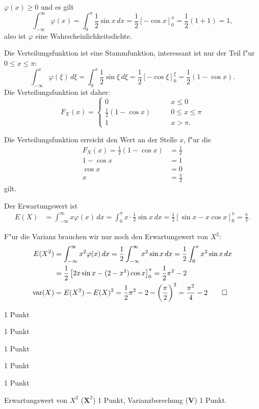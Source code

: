 \begin{loesung}
\begin{teilaufgaben}
\item
$\varphi(x)\ge 0$ und es gilt
\[
\int_{-\infty}^\infty\varphi(x)=\int_0^\pi\frac12\sin x\,dx
=
\frac12\left[-\cos x\right]_0^\pi=\frac12(1+1)=1,
\]
also ist $\varphi$ eine Wahrscheinlichkeitsdichte.
\item
Die Verteilungsfunktion ist eine Stammfunktion, interessant ist nur
der Teil f"ur $0\le x\le \pi$:
\[
\int_{-\infty}^x\varphi(\xi)\,d\xi
=
\int_0^x\frac12\sin\xi\,d\xi
=
\frac12\left[-\cos\xi\right]_0^\xi=\frac12(1-\cos x).
\]
Die Verteilungsfunktion ist daher:
\[
F_X(x)=\begin{cases}
0&\qquad x\le 0\\
\frac12(1-\cos x)&\qquad 0\le x\le \pi\\
1&\qquad x > \pi.
\end{cases}
\]
\item Die Verteilungsfunktion erreicht den Wert an der Stelle $x$, f"ur die
\begin{align*}
F_X(x)=\frac12(1-\cos x)&=\frac12\\
1-\cos x&=1\\
\cos x&=0\\
x&=\frac{\pi}2
\end{align*}
gilt.
\item
Der Erwartungswert ist
\begin{align*}
E(X)
&=
\int_{-\infty}^\infty x\varphi(x)\,dx
=
\int_0^\pi x\cdot\frac12\sin x\,dx
=
\frac12
\left[\sin x-x\cos x\right]_0^\pi=\frac{\pi}2.
\end{align*}
\item
F"ur die Varianz brauchen wir nur noch den Erwartungswert von $X^2$:
\begin{align*}
E(X^2)
&=
\int_{-\infty}^\infty x^2\varphi(x)\,dx
=
\frac12\int_{-\infty}^\infty x^2\sin x\,dx
=
\frac12\int_0^\pi x^2\sin x\,dx 
\\
&=
\frac12\left[
2x\sin x-(2-x^2)\cos x
\right]_0^\pi
=
\frac12\pi^2-2
\\
\operatorname{var}(X)&=E(X^2)-E(X)^2=
\frac12\pi^2-2-\biggl(\frac{\pi}2\biggr)^2
=\frac{\pi^2}4-2
\qedhere
\end{align*}
\end{teilaufgaben}
\end{loesung}

\begin{bewertung}
\begin{teilaufgaben}
\item 1 Punkt
\item 1 Punkt
\item 1 Punkt
\item 1 Punkt
\item 1 Punkt
\item Erwartungswert von $X^2$ ($\textbf{X}^2$) 1 Punkt,
Varianzberechung (\textbf{V}) 1 Punkt.
\end{teilaufgaben}
\end{bewertung}

